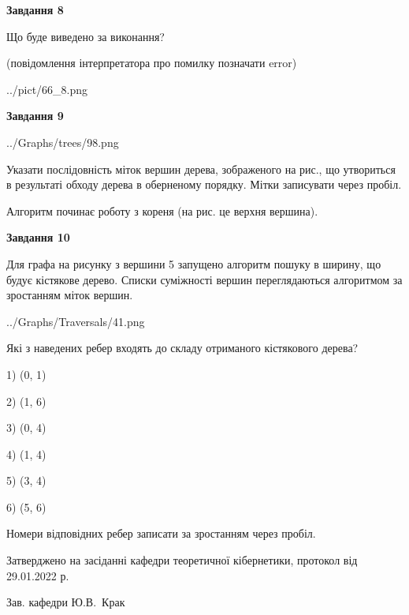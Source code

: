 \documentclass[12pt, ukrainian]{article}
\begin{document}
{\begin {large}
{\begin {center}\textbf{Завдання 8}\end {center}}\par
Що буде виведено за виконання?\par
 (повідомлення інтерпретатора про помилку позначати error)\par
\begin{center}
	{../pict/66_8.png}
\end{center}
\newpage

{\begin {center}\textbf{Завдання 9}\end {center}}\par

\begin{center}
	{../Graphs/trees/98.png}
\end{center}
Указати послідовність міток вершин дерева, зображеного на рис., що утвориться в результаті обходу дерева в оберненому порядку. Мітки записувати через пробіл.\par Алгоритм починає роботу з кореня (на рис. це верхня вершина).\par
\newpage

{\begin {center}\textbf{Завдання 10}\end {center}}\par
Для графа на рисунку з вершини 5 запущено алгоритм пошуку в ширину, що будує кістякове дерево. Списки суміжності вершин переглядаються алгоритмом за зростанням міток вершин.\par
\begin{center}
	{../Graphs/Traversals/41.png}
\end{center}
\par Які з наведених ребер входять до складу отриманого кістякового дерева?\par
1) (0, 1)\par
2) (1, 6)\par
3) (0, 4)\par
4) (1, 4)\par
5) (3, 4)\par
6) (5, 6)\par
{\vskip 15pt} Номери відповідних ребер записати за зростанням через пробіл.\par
\newpage


\end {large}
}
{\smallskip \begin {small} Затверджено на засіданні кафедри теоретичної кібернетики, протокол  від   29.01.2022 р.\par\smallskip\smallskip
{\parbox {6.5 cm}{Зав. кафедри \dotfill Ю.В.~Крак}} \end{small}}
\end{document}
